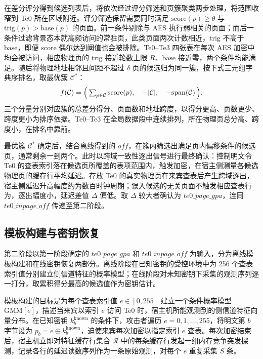 在差分评分得到候选列表后，将依次经过评分筛选和页簇聚类两步处理，将范围收窄到 Te0 所在区域附近。评分筛选保留需要同时满足 $\mathrm{score}(p) \geq \theta$ 与 $\mathrm{trig}(p) > \mathrm{base}(p)$ 的页面。前一条件剔除与 AES 执行弱相关的页面；而后一条件过滤背景态本就高频访问的常驻页，此类页面两次计数相近，$\mathrm{trig}$ 不高于 $\mathrm{base}$，即便 $\mathrm{score}$ 偶尔达到阈值也会被排除。Te0--Te3 四张表在每次 AES 加密中均会被访问，相应物理页的 $\mathrm{trig}$ 接近轮数上限 $R$、$\mathrm{base}$ 接近零，两个条件均能满足。随后将物理地址相邻且间距不超过 $\delta$ 页的候选归为同一簇，按下式三元组字典序排名，取最优簇 $\mathcal{C}^*$：
\begin{equation}
  f(\mathcal{C}) = \Bigl(\,\textstyle\sum_{p \in \mathcal{C}} \mathrm{score}(p),\quad -|\mathcal{C}|,\quad {-\mathrm{span}(\mathcal{C})}\,\Bigr).
  \label{eq:cluster_score}
\end{equation}
三个分量分别对应簇的总差分得分、页面数和地址跨度，以得分更高、页数更少、跨度更小为排序依据。Te0--Te3 在全局数据段中连续排列，所在物理页总分高、跨度小，在排名中靠前。

最优簇 $\mathcal{C}^*$ 确定后，结合离线得到的 $\mathit{off}$，在簇内筛选出满足页内偏移条件的候选页，通常剩余一到两个。此时以跨域一致性逐出信号进行最终确认：控制明文令 Te0 的查表索引落在候选页所覆盖的表项范围内，触发加密，在宿主侧测量各候选物理页的缓存行平均延迟。存放 Te0 的真实物理页在来宾查表后产生跨域逐出，宿主侧延迟升高幅度约为数百时钟周期；误入候选的无关页面不触发相应查表行为，逐出幅度小，延迟差值 $\Delta$ 偏低。取 $\Delta$ 较大者确认为 $\mathit{te0\_page\_gpa}$，连同 $\mathit{te0\_inpage\_off}$ 传递至第二阶段。

\subsection{模板构建与密钥恢复}
\label{sec:phase2}

第二阶段以第一阶段确定的 $\mathit{te0\_page\_gpa}$ 和 $\mathit{te0\_inpage\_off}$ 为输入，分为离线模板构建和在线密钥恢复两部分。离线阶段在已知密钥的受控环境中为 256 个查表索引值分别建立侧信道特征的概率模型；在线阶段对未知密钥下采集的观测序列逐一打分，取累积得分最高的候选值作为密钥估计。

模板构建的目标是为每个查表索引值 $e \in [0, 255]$ 建立一个条件概率模型 $\mathrm{GMM}[e]$，描述当来宾以索引 $e$ 访问 Te0 时，宿主机所能观测到的侧信道特征向量分布。在已知密钥 $k_b^{\mathrm{known}}$ 的条件下，攻击者遍历 $e = 0, 1, \ldots, 255$，将明文第 $b$ 字节设为 $p_b = e \oplus k_b^{\mathrm{known}}$，迫使来宾每次加密以指定索引 $e$ 查表。每次加密结束后，宿主机立即对特征缓存行集合 $\mathcal{R}$ 中的每条缓存行发起一组内存竞争突发探测，记录各行的延迟读数序列作为一条原始观测，对每个 $e$ 重复采集 $S$ 条。

